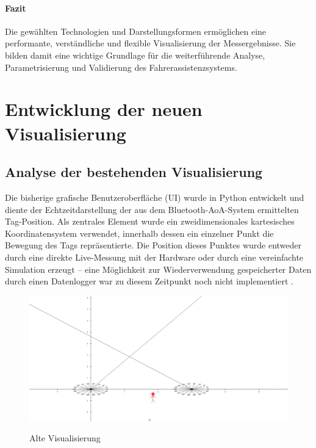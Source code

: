 \documentclass[a4paper, 12pt]{article} %
\begin{document}
\paragraph{Fazit}

Die gewählten Technologien und Darstellungsformen ermöglichen eine performante, verständliche und flexible Visualisierung der Messergebnisse. Sie 
bilden damit eine wichtige Grundlage für die weiterführende Analyse, Parametrisierung und Validierung des Fahrerassistenzsystems.

\section{Entwicklung der neuen Visualisierung}
\subsection{Analyse der bestehenden Visualisierung}

Die bisherige grafische Benutzeroberfläche (\ac{UI}) wurde in Python entwickelt und diente der Echtzeitdarstellung der aus dem Bluetooth-\ac{AoA}-System ermittelten
Tag-Position. Als zentrales Element wurde ein zweidimensionales kartesisches Koordinatensystem verwendet, innerhalb dessen ein einzelner Punkt die 
Bewegung des Tags repräsentierte. Die Position dieses Punktes wurde entweder durch eine direkte Live-Messung mit der Hardware oder durch eine 
vereinfachte Simulation erzeugt – eine Möglichkeit zur Wiederverwendung gespeicherter Daten durch einen Datenlogger war zu diesem Zeitpunkt noch nicht
implementiert \cite{tkinter_book}.

\begin{figure}[H]
    \includegraphics[width=1\linewidth]{images/Alte Visualisierung.png}\\[1ex]
    \centering
    \caption{Alte Visualisierung}
    \label{ABBILDUNG}
\end{figure}
\end{document}
